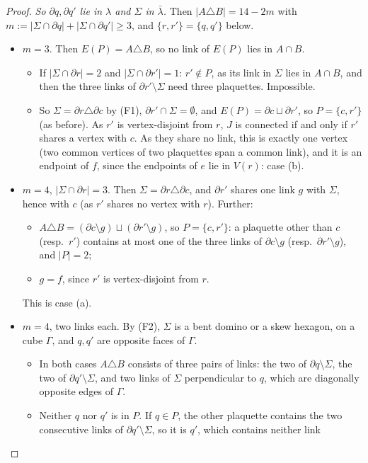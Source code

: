 \documentclass[11pt,a4paper]{article}
\theoremstyle{definition}
\theoremstyle{remark}
\begin{document}
\begin{proof}
\emph{So $\partial q,\partial q'$ lie in $\lambda$ and $\Sigma$ in $\bar\lambda$.} Then $|A\triangle B|=14-2m$ with $m:=|\Sigma\cap\partial q|+|\Sigma\cap\partial q'|\ge3$, and $\{r,r'\}=\{q,q'\}$
below.
\begin{itemize}
\item $m=3$. Then $E(P)=A\triangle B$, so no link of $E(P)$ lies in $A\cap B$.
\begin{itemize}
\item If $|\Sigma\cap\partial r|=2$ and $|\Sigma\cap\partial r'|=1$: $r'\notin P$, as its link in $\Sigma$ lies in $A\cap B$, and then the three links of $\partial r'\setminus\Sigma$ need three
plaquettes. Impossible.
\item So $\Sigma=\partial r\triangle\partial c$ by (F1), $\partial r'\cap\Sigma=\emptyset$, and $E(P)=\partial c\sqcup\partial r'$, so $P=\{c,r'\}$ (as before). As $r'$ is vertex-disjoint from $r$, $J$ is
connected if and only if $r'$ shares a vertex with $c$. As they share no link, this is exactly one vertex (two common vertices of two plaquettes span a common link), and it is an endpoint
of $f$, since the endpoints of $e$ lie in $V(r)$: case (b).
\end{itemize}
\item $m=4$, $|\Sigma\cap\partial r|=3$. Then $\Sigma=\partial r\triangle\partial c$, and $\partial r'$ shares one link $g$ with $\Sigma$, hence with $c$ (as $r'$ shares no vertex with $r$). Further:
\begin{itemize}
\item $A\triangle B=(\partial c\setminus g)\sqcup(\partial r'\setminus g)$, so $P=\{c,r'\}$: a plaquette other than $c$ (resp.\ $r'$) contains at most one of the three links of
$\partial c\setminus g$ (resp.\ $\partial r'\setminus g$), and $|P|=2$;
\item $g=f$, since $r'$ is vertex-disjoint from $r$.
\end{itemize}
This is case (a).
\item $m=4$, two links each. By (F2), $\Sigma$ is a bent domino or a skew hexagon, on a cube $\Gamma$, and $q,q'$ are opposite faces of $\Gamma$.
\begin{itemize}
\item In both cases $A\triangle B$ consists of three pairs of links: the two of $\partial q\setminus\Sigma$, the two of $\partial q'\setminus\Sigma$, and two links of $\Sigma$ perpendicular to $q$,
which are diagonally opposite edges of $\Gamma$.
\item Neither $q$ nor $q'$ is in $P$. If $q\in P$, the other plaquette contains the two consecutive links of $\partial q'\setminus\Sigma$, so it is $q'$, which contains neither link

\end{itemize}
\end{itemize}
\end{proof}
\end{document}

